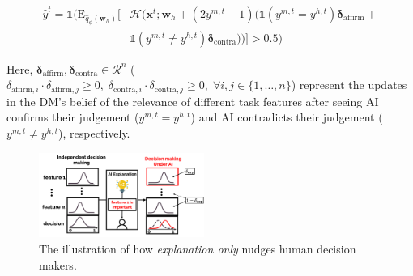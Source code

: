 \documentclass[letterpaper]{article} %
\begin{document}
\begin{small}
    \begin{equation}
\begin{split}
    \hat{y}^{t} =  \mathds{1}( \mathrm{E}_{\hat{q}_{\phi}(\bm{w}_h)}  [ &\mathcal{H}(\bm{x}^t;\bm{w}_h +
     (2y^{m,t} -1) (\mathds{1}(y^{m,t} = y^{h,t})\bm{\delta}_{\text{affirm}}+\\
     &\mathds{1}(y^{m,t} \neq y^{h,t})\bm{\delta}_{\text{contra}}))]>0.5)
\end{split}
\end{equation}
\end{small}
\noindent Here, \( \bm{\delta}_{\text{affirm}}, \bm{\delta}_{\text{contra}} \in \mathcal{R}^n \) ($ \delta_{\text{affirm},i} \cdot \delta_{\text{affirm},j} \geq 0, \; \delta_{\text{contra},i} \cdot \delta_{\text{contra},j} \geq 0, \; \forall i, j \in \{1, \dots, n\}$) represent the updates in the DM's belief of the relevance of different task features after seeing AI confirms their judgement ($y^{m,t} = y^{h,t}$) and AI contradicts their judgement ($y^{m,t} \neq y^{h,t}$), respectively.
\begin{figure}[ht]
    \centering
        \includegraphics[width=0.48\textwidth]{figures/ai_exp.png}
    \caption{The illustration of how \emph{explanation only} nudges human decision makers.
    }
    \label{fig:ill_exp}
\end{figure}
\end{document}

